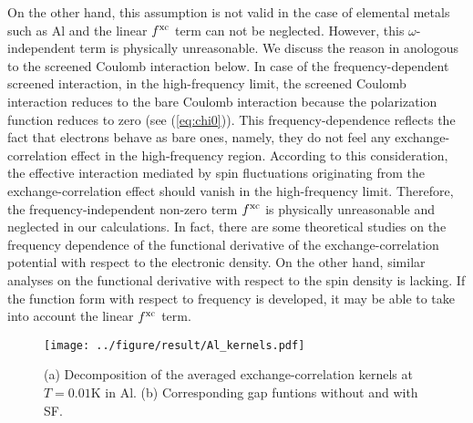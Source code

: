 On the other hand, this assumption is not valid in the case of elemental metals such as Al and the 
linear $f^{\rm xc}$ term can not be neglected.
However, this $\omega$-independent term is physically unreasonable. 
We discuss the reason in anologous to the screened Coulomb interaction below.
In case of the frequency-dependent screened interaction, in the high-frequency limit, 
the screened Coulomb interaction reduces to the bare Coulomb interaction because
the polarization function reduces to zero (see (\ref{eq:chi0})).
This frequency-dependence reflects the fact that electrons behave as bare ones, namely, 
they do not feel any exchange-correlation effect in the high-frequency region.
According to this consideration, the effective interaction mediated by spin fluctuations originating
from the exchange-correlation effect should vanish in the high-frequency limit.
Therefore, the frequency-independent non-zero term $f^{\rm xc}$ is physically unreasonable and 
neglected in our calculations.
In fact, there are some theoretical studies on the frequency dependence of the functional derivative
of the exchange-correlation potential with respect to the electronic density\cite{Qian2002}.
On the other hand, similar analyses on the functional derivative with respect to the spin density is lacking.
If the function form with respect to frequency is developed, it may be able to take into account the 
linear $f^{\rm xc}$ term.
%
%
%
\begin{figure}[h]
	\centering
	\texttt{[image: ../figure/result/Al\_kernels.pdf]}
	\caption{(a) Decomposition of the averaged exchange-correlation kernels
		at $T=0.01$K in Al. (b) Corresponding gap funtions without 
	and with SF.}
	\label{fig:Alaveker}
\end{figure}
%
%
%


